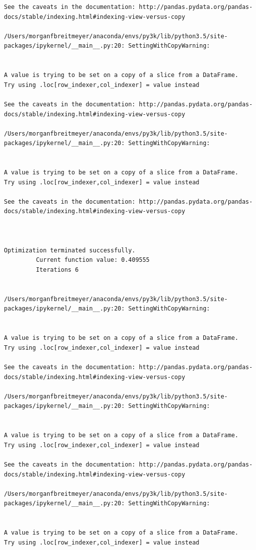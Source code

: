 \begin{lstlisting}
See the caveats in the documentation: http://pandas.pydata.org/pandas-docs/stable/indexing.html#indexing-view-versus-copy

/Users/morganfbreitmeyer/anaconda/envs/py3k/lib/python3.5/site-packages/ipykernel/__main__.py:20: SettingWithCopyWarning:


A value is trying to be set on a copy of a slice from a DataFrame.
Try using .loc[row_indexer,col_indexer] = value instead

See the caveats in the documentation: http://pandas.pydata.org/pandas-docs/stable/indexing.html#indexing-view-versus-copy

/Users/morganfbreitmeyer/anaconda/envs/py3k/lib/python3.5/site-packages/ipykernel/__main__.py:20: SettingWithCopyWarning:


A value is trying to be set on a copy of a slice from a DataFrame.
Try using .loc[row_indexer,col_indexer] = value instead

See the caveats in the documentation: http://pandas.pydata.org/pandas-docs/stable/indexing.html#indexing-view-versus-copy



Optimization terminated successfully.
         Current function value: 0.409555
         Iterations 6


/Users/morganfbreitmeyer/anaconda/envs/py3k/lib/python3.5/site-packages/ipykernel/__main__.py:20: SettingWithCopyWarning:


A value is trying to be set on a copy of a slice from a DataFrame.
Try using .loc[row_indexer,col_indexer] = value instead

See the caveats in the documentation: http://pandas.pydata.org/pandas-docs/stable/indexing.html#indexing-view-versus-copy

/Users/morganfbreitmeyer/anaconda/envs/py3k/lib/python3.5/site-packages/ipykernel/__main__.py:20: SettingWithCopyWarning:


A value is trying to be set on a copy of a slice from a DataFrame.
Try using .loc[row_indexer,col_indexer] = value instead

See the caveats in the documentation: http://pandas.pydata.org/pandas-docs/stable/indexing.html#indexing-view-versus-copy

/Users/morganfbreitmeyer/anaconda/envs/py3k/lib/python3.5/site-packages/ipykernel/__main__.py:20: SettingWithCopyWarning:


A value is trying to be set on a copy of a slice from a DataFrame.
Try using .loc[row_indexer,col_indexer] = value instead


\end{lstlisting}
